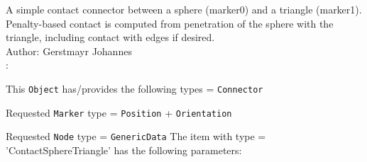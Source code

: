 
\label{sec:item:ObjectContactSphereTriangle}
A simple contact connector between a sphere (marker0) and a triangle (marker1). Penalty-based contact is computed from penetration of the sphere with the triangle, including contact with edges if desired.
\vspace{12pt}\\

\noindent Author: Gerstmayr Johannes
\vspace{12pt}\\

\noindent {}:
\bi
  \item This \texttt{Object} has/provides the following types = \texttt{Connector}
  \item Requested \texttt{Marker} type = \texttt{Position} + \texttt{Orientation}
  \item Requested \texttt{Node} type = \texttt{GenericData}
\ei\vspace{12pt} \noindent 
The item  with type = 'ContactSphereTriangle' has the following parameters:
\vspace{-0.5cm}\\
\vspace{-0.5cm}\\
